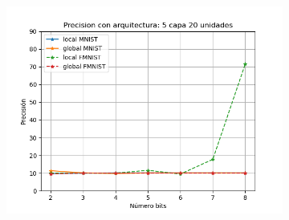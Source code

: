 \begin{figure}[H]
\begin{subfigure}[H]{0.45\textwidth}
    \includegraphics[width=\textwidth]{imagenes/backprop/Precision con arquitectura: 5 capa 20 unidades.png} 
    \end{subfigure}
\end{figure}
\newpage
